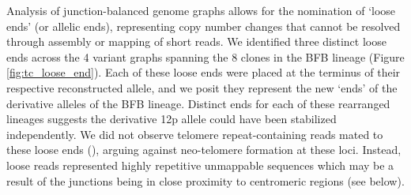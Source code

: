 \documentclass[phd,tocprelim]{cornell}
\renewcommand{\caption}[1]{\singlespacing\hangcaption{#1}\normalspacing}
\begin{document}


Analysis of junction-balanced genome graphs allows for the nomination of ‘loose ends’ (or allelic ends), representing copy number changes that cannot be resolved through assembly or mapping of short reads. We identified three distinct loose ends across the 4 variant graphs spanning the 8 clones in the BFB lineage (Figure \ref{fig:tc_loose_end}). Each of these loose ends were placed at the terminus of their respective reconstructed allele, and we posit they represent the new ‘ends’ of the derivative alleles of the BFB lineage. Distinct ends for each of these rearranged lineages suggests the derivative 12p allele could have been stabilized independently. We did not observe telomere repeat-containing reads mated to these loose ends (), arguing against neo-telomere formation at these loci. Instead, loose reads represented highly repetitive unmappable sequences which may be a result of the junctions being in close proximity to centromeric regions (see below).
\end{document}
